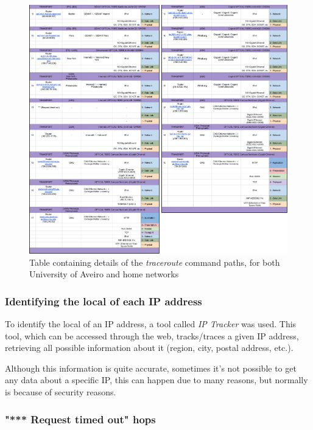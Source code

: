 \documentclass{article}
\newcommand\tab[1][1cm]{\hspace*{#1}}
\begin{document}
\vspace*{\fill}
    \begin{figure}
        \includegraphics[width=1 \textwidth]{images/traceroute_part2.png}
        \caption{Table containing details of the \textit{traceroute} command paths, for both University of Aveiro and home networks}
    \end{figure}
\vspace*{\fill}

\subsubsection{Identifying the local of each IP address}

\tab To identify the local of an IP address, a tool called \textit{IP Tracker} was used. This tool, which can be accessed through the web, tracks/traces a given IP address, retrieving all possible information about it (region, city, postal address, etc.).

Although this information is quite accurate, sometimes it's not possible to get any data about a specific IP, this can happen due to many reasons, but normally is because of security reasons.

\subsubsection{"*** Request timed out" hops}
\end{document}
